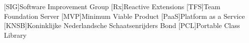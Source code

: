 [SIG]{Software Improvement Group}
[Rx]{Reactive Extensions}
[TFS]{Team Foundation Server}
[MVP]{Minimum Viable Product}
[PaaS]{Platform as a Service}
[KNSB]{Koninklijke Nederlandsche Schaatsenrijders Bond}
[PCL]{Portable Class Library}
